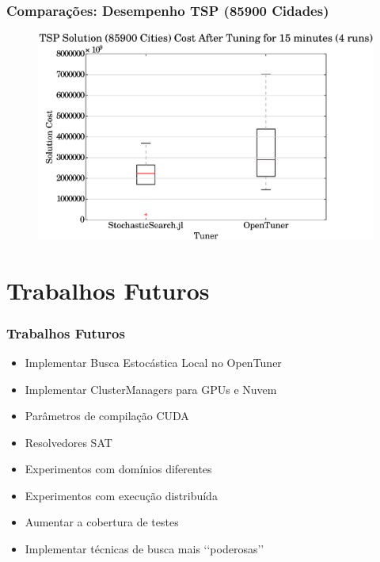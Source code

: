 \documentclass[10pt, compress]{beamer}
\begin{document}
\begin{frame}[fragile]
    \frametitle{Comparações: Desempenho TSP (85900 Cidades)}
    \begin{figure}[H]
        \centering
        \includegraphics[width=1\textwidth]{pla85900_15min_comparison}
    \end{figure}%
\end{frame}

\section{Trabalhos Futuros}

\begin{frame}[fragile]
    \frametitle{Trabalhos Futuros}
    \begin{itemize}
        \item Implementar Busca Estocástica Local no \alert{OpenTuner}
            \pause
        \item Implementar \alert{ClusterManagers} para \alert{GPUs} e \alert{Nuvem}
            \pause
        \item Parâmetros de compilação \alert{CUDA}
        \item Resolvedores \alert{SAT}
            \pause
        \item Experimentos com \alert{domínios diferentes}
        \item Experimentos com \alert{execução distribuída}
            \pause
        \item \alert{Aumentar} a cobertura de testes
            \pause
        \item Implementar técnicas de busca mais \lq{}\lq{}\alert{poderosas}\rq{}\rq{}
    \end{itemize}
\end{frame}
\end{document}
